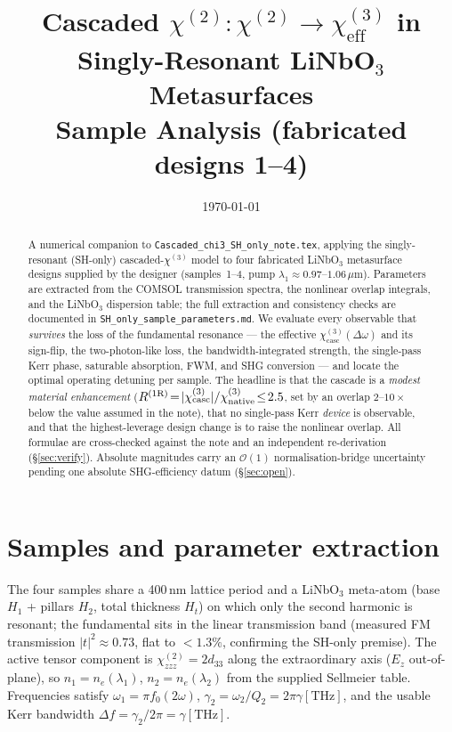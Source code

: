 \documentclass[11pt,a4paper]{article}
\newcommand{\chitwo}{\chi^{(2)}}
\newcommand{\chithree}{\chi^{(3)}}
\newcommand{\Dom}{\Delta\omega}
\newcommand{\chicasc}{\chithree_{\text{casc}}}
\begin{document}
\title{Cascaded $\chitwo{:}\chitwo \to \chithree_\text{eff}$ in Singly-Resonant
       LiNbO$_3$ Metasurfaces\\[2pt]
       \large Sample Analysis (fabricated designs 1--4)}
\author{}
\date{\today}
\maketitle

\begin{abstract}
\noindent
A numerical companion to \texttt{Cascaded\_chi3\_SH\_only\_note.tex}, applying the
singly-resonant (SH-only) cascaded-$\chithree$ model to four fabricated LiNbO$_3$
metasurface designs supplied by the designer (samples~1--4, pump
$\lambda_1\!\approx\!0.97$--$1.06\,\mu$m). Parameters are extracted from the
COMSOL transmission spectra, the nonlinear overlap integrals, and the LiNbO$_3$
dispersion table; the full extraction and consistency checks are documented in
\texttt{SH\_only\_sample\_parameters.md}. We evaluate every observable that
\emph{survives} the loss of the fundamental resonance --- the effective
$\chicasc(\Dom)$ and its sign-flip, the two-photon-like loss, the
bandwidth-integrated strength, the single-pass Kerr phase, saturable absorption,
FWM, and SHG conversion --- and locate the optimal operating detuning per sample.
The headline is that the cascade is a \emph{modest material enhancement}
($R^{(1\mathrm R)}\!=\!|\chicasc|/\chithree_{\rm native}\!\le\!2.5$, set by an
overlap $2$--$10\times$ below the value assumed in the note), that no single-pass
Kerr \emph{device} is observable, and that the highest-leverage design change is
to raise the nonlinear overlap. All formulae are cross-checked against the
note and an independent re-derivation (\S\ref{sec:verify}). Absolute magnitudes
carry an $\mathcal{O}(1)$ normalisation-bridge uncertainty pending one absolute
SHG-efficiency datum (\S\ref{sec:open}).
\end{abstract}

\tableofcontents
\bigskip

\section{Samples and parameter extraction}
\label{sec:samples}

The four samples share a 400\,nm lattice period and a LiNbO$_3$ meta-atom (base
$H_1$ + pillars $H_2$, total thickness $H_t$) on which only the second harmonic is
resonant; the fundamental sits in the linear transmission band (measured FM
transmission $|t|^2\!\approx\!0.73$, flat to $<\!1.3\%$, confirming the SH-only
premise). The active tensor component is $\chitwo_{zzz}=2d_{33}$ along the
extraordinary axis ($E_z$ out-of-plane), so $n_1=n_e(\lambda_1)$,
$n_2=n_e(\lambda_2)$ from the supplied Sellmeier table. Frequencies satisfy
$\omega_1=\pi f_0(2\omega)$, $\gamma_2 = \omega_2/Q_2 = 2\pi\gamma[\text{THz}]$,
and the usable Kerr bandwidth $\Delta f = \gamma_2/2\pi = \gamma[\text{THz}]$.
\end{document}
